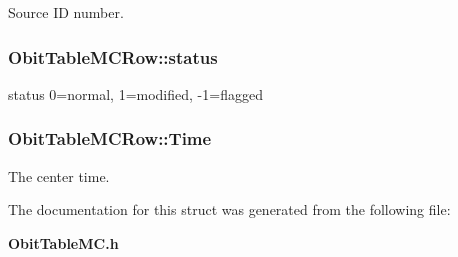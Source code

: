 Source ID number. 

\subsubsection{ {\bf Obit\-Table\-MCRow::status}}\label{structObitTableMCRow_o27}


status 0=normal, 1=modified, -1=flagged 

\subsubsection{ {\bf Obit\-Table\-MCRow::Time}}\label{structObitTableMCRow_o6}


The center time. 



The documentation for this struct was generated from the following file:\begin{CompactItemize}
\item 
{\bf Obit\-Table\-MC.h}\end{CompactItemize}
